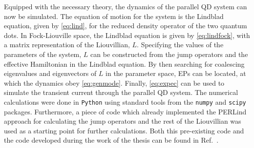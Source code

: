 \documentclass[../main.tex]{subfiles}
\begin{document}
Equipped with the necessary theory, the dynamics of the parallel QD system can now be simulated. The equation of motion for the system is the Lindblad equation, given by \cref{eq:lind}, for the reduced density operator of the two quantum dots. In Fock-Liouville space, the Lindblad equation is given by \cref{eq:lindfock}, with a matrix representation of the Liouvillian, $L$. Specifying the values of the parameters of the system, $L$ can be constructed from the jump operators and the effective Hamiltonian in the Lindblad equation. By then searching for coalescing eigenvalues and eigenvectors of $L$ in the parameter space, EPs can be located, at which the dynamics obey \cref{eq:genmode}. Finally, \cref{eq:expec} can be used to simulate the transient current through the parallel QD system. The numerical calculations were done in \verb+Python+ using standard tools from the \verb+numpy+ and \verb+scipy+ packages. Furthermore, a piece of code which already implemented the PERLind approach for calculating the jump operators and the rest of the Liouvillian was used as a starting point for further calculations. Both this pre-existing code and the code developed during the work of the thesis can be found in Ref.~\cite{git}.
\end{document}
